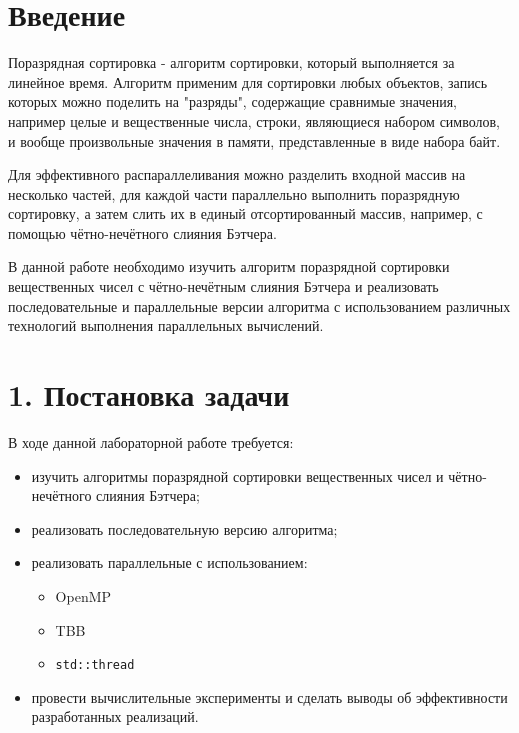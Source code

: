 \documentclass{report}
\begin{document}
    \newpage
    \section*{Введение}
    \par Поразрядная сортировка - алгоритм  сортировки, который выполняется за линейное время. Алгоритм применим для сортировки любых объектов, запись которых можно поделить на "разряды", содержащие сравнимые значения, например целые и вещественные числа, строки, являющиеся набором символов, и вообще произвольные значения в памяти, представленные в виде набора байт.
    \par Для эффективного распараллеливания можно разделить входной массив на несколько частей, для каждой части параллельно выполнить поразрядную сортировку, а затем слить их в единый отсортированный массив, например, с помощью чётно-нечётного слияния Бэтчера.
    \par В данной работе необходимо изучить алгоритм поразрядной сортировки вещественных чисел с чётно-нечётным слияния Бэтчера и реализовать последовательные и параллельные версии алгоритма с использованием различных технологий выполнения параллельных вычислений.

    \newpage
    \section*{1. Постановка задачи}
    В ходе данной лабораторной работе требуется:
    \begin{itemize}
        \item изучить алгоритмы поразрядной сортировки вещественных чисел и чётно-нечётного слияния Бэтчера;
        \item реализовать последовательную версию алгоритма;
        \item реализовать параллельные с использованием:
        \begin{itemize}
            \item OpenMP
            \item TBB
            \item \verb|std::thread|
        \end{itemize}
        \item провести вычислительные эксперименты и сделать выводы об эффективности разработанных реализаций.
    \end{itemize}
\end{document}
